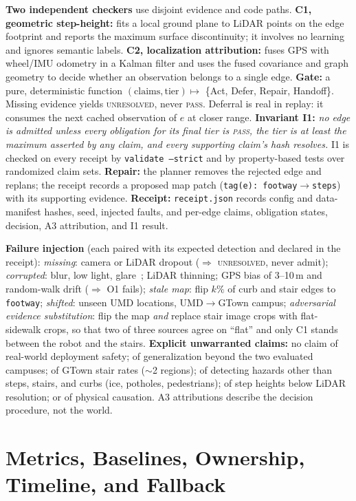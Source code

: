 \documentclass[10pt,letterpaper]{article}
\newcommand{\cl}[1]{\texttt{#1}}
\begin{document}
\textbf{Two independent checkers} use disjoint evidence and code paths.
\textbf{C1, geometric step-height:} fits a local ground plane to LiDAR points on the edge footprint and
reports the maximum surface discontinuity; it involves no learning and ignores semantic labels.
\textbf{C2, localization attribution:} fuses GPS with wheel/IMU odometry in a Kalman filter and uses
the fused covariance and graph geometry to decide whether an observation belongs to a single edge. \textbf{Gate:} a pure, deterministic function
$(\text{claims}, \text{tier}) \mapsto$ \{Act, Defer, Repair, Handoff\}. Missing evidence yields
\textsc{unresolved}, never \textsc{pass}. Deferral is real in replay: it consumes the next cached
observation of $e$ at closer range. \textbf{Invariant I1:} \emph{no edge is admitted unless every
obligation for its final tier is \textup{\textsc{pass}}, the tier is at least the maximum asserted by any
claim, and every supporting claim's hash resolves.} I1 is checked on every receipt by
\cl{validate --strict} and by property-based tests over randomized claim sets.
\textbf{Repair:} the planner removes the rejected edge and replans; the receipt records a proposed map
patch (\cl{tag(e): footway$\to$steps}) with its supporting evidence.
\textbf{Receipt:} \cl{receipt.json} records config and data-manifest hashes, seed, injected faults,
and per-edge claims, obligation states, decision, A3 attribution, and I1 result.

\textbf{Failure injection} (each paired with its expected detection and declared in the receipt):
\emph{missing}: camera or LiDAR dropout ($\Rightarrow$ \textsc{unresolved}, never admit);
\emph{corrupted}: blur, low light, glare~\cite{imagenetc}; LiDAR thinning; GPS bias of 3--10\,m and
random-walk drift ($\Rightarrow$ O1 fails); \emph{stale map}: flip $k\%$ of curb and stair edges to
\cl{footway}; \emph{shifted}: unseen UMD locations, UMD$\to$GTown campus; \emph{adversarial evidence substitution}:
flip the map \emph{and} replace stair image crops with flat-sidewalk crops, so that two of three sources
agree on ``flat'' and only C1 stands between the robot and the stairs.
\textbf{Explicit unwarranted claims:} no claim of real-world deployment safety; of generalization
beyond the two evaluated campuses; of GTown stair rates ($\sim$2 regions); of detecting hazards other than steps, stairs, and curbs (ice, potholes,
pedestrians); of step heights below LiDAR resolution; or of physical causation. A3 attributions
describe the decision procedure, not the world.

\section{Metrics, Baselines, Ownership, Timeline, and Fallback}
\end{document}

